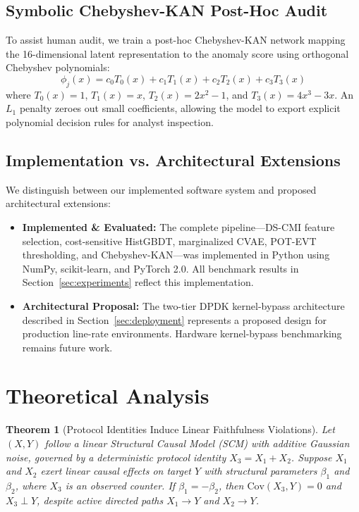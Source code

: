 \documentclass[10pt,journal,compsoc]{IEEEtran}
\newtheorem{theorem}{Theorem}
\begin{document}
\subsection{Symbolic Chebyshev-KAN Post-Hoc Audit}
To assist human audit, we train a post-hoc Chebyshev-KAN network mapping the 16-dimensional latent representation to the anomaly score using orthogonal Chebyshev polynomials:
\begin{equation}
\phi_j(x) = c_0 T_0(x) + c_1 T_1(x) + c_2 T_2(x) + c_3 T_3(x)
\end{equation}
where $T_0(x) = 1$, $T_1(x) = x$, $T_2(x) = 2x^2 - 1$, and $T_3(x) = 4x^3 - 3x$. An $L_1$ penalty zeroes out small coefficients, allowing the model to export explicit polynomial decision rules for analyst inspection.

\subsection{Implementation vs. Architectural Extensions}
We distinguish between our implemented software system and proposed architectural extensions:
\begin{itemize}
    \item \textbf{Implemented & Evaluated:} The complete pipeline—DS-CMI feature selection, cost-sensitive HistGBDT, marginalized CVAE, POT-EVT thresholding, and Chebyshev-KAN—was implemented in Python using NumPy, scikit-learn, and PyTorch 2.0. All benchmark results in Section~\ref{sec:experiments} reflect this implementation.
    \item \textbf{Architectural Proposal:} The two-tier DPDK kernel-bypass architecture described in Section~\ref{sec:deployment} represents a proposed design for production line-rate environments. Hardware kernel-bypass benchmarking remains future work.
\end{itemize}

\section{Theoretical Analysis}\label{sec:proofs}
\begin{theorem}[Protocol Identities Induce Linear Faithfulness Violations]
Let $(X, Y)$ follow a linear Structural Causal Model (SCM) with additive Gaussian noise, governed by a deterministic protocol identity $X_3 = X_1 + X_2$. Suppose $X_1$ and $X_2$ exert linear causal effects on target $Y$ with structural parameters $\beta_1$ and $\beta_2$, where $X_3$ is an observed counter. If $\beta_1 = -\beta_2$, then $\mathrm{Cov}(X_3, Y) = 0$ and $X_3 \perp Y$, despite active directed paths $X_1 \to Y$ and $X_2 \to Y$.
\end{theorem}
\end{document}
